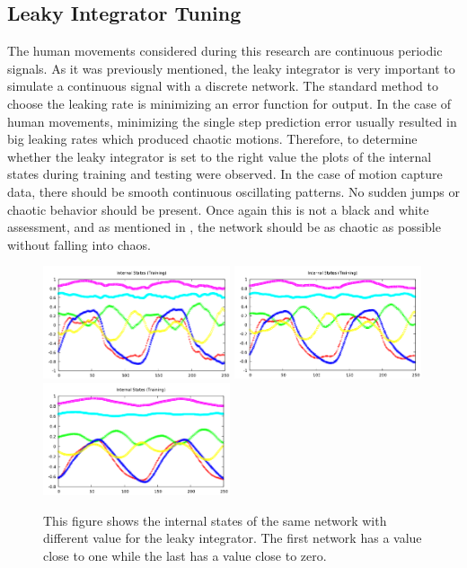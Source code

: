 \documentclass[letterpaper,9pt]{article}
\begin{document}
\subsection{Leaky Integrator Tuning}

The human movements considered during this research are continuous periodic signals. As it was previously mentioned, the leaky integrator is very important to simulate a continuous signal with a discrete network. The standard method to choose the leaking rate is minimizing an error function for output. In the case of human movements, minimizing the single step prediction error usually resulted in big leaking rates which produced chaotic motions. Therefore, to determine whether the leaky integrator is set to the right value the plots of the internal states during training and testing were observed. In the case of motion capture data, there should be smooth continuous oscillating patterns. No sudden jumps or chaotic behavior should be present. Once again this is not a black and white assessment, and as mentioned in \cite{ESNVerstraeten}, the network should be as chaotic as possible without falling into chaos.

\begin{figure}[h!]
  \centering
  \includegraphics[height=125px]{Extra/sample_leaky_big.png}
  \includegraphics[height=125px]{Extra/sample_leaky_ok.png}
  \includegraphics[height=125px]{Extra/sample_leaky_low.png}
    \caption[Leaky Integrator Comparison]{This figure shows the internal states of the same network with different value for the leaky integrator. The first network has a value close to one while the last has a value close to zero.}
\end{figure}
\end{document}
